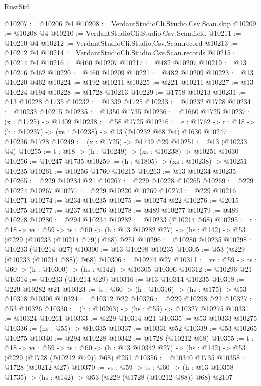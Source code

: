\begin{lexlean}{RustStd}
\begin{coremodule}
@10207 := @10206 @4
@10208 := VerdantStudioCli.Studio.Csv.Scan.skip
@10209 := @10208 @4
@10210 := VerdantStudioCli.Studio.Csv.Scan.field
@10211 := @10210 @4
@10212 := VerdantStudioCli.Studio.Csv.Scan.record
@10213 := @10212 @4
@10214 := VerdantStudioCli.Studio.Csv.Scan.records
@10215 := @10214 @4
@10216 := @460 @10207
@10217 := @482 @10207
@10219 := @13 @10216 @462
@10220 := @460 @10209
@10221 := @482 @10209
@10223 := @13 @10220 @462
@10224 := @192 @10211
@10225 := @221 @10211
@10227 := @13 @10224 @194
@10228 := @1728 @10213
@10229 := @1758 @10213
@10231 := @13 @10228 @1735
@10232 := @1339 @1725
@10233 := @10232 @1728
@10234 := @10233 @10215
@10235 := @1350 @1735
@10236 := @1660 @1725
@10237 := (x : @1725) -> @1409
@10238 := @58 @1725
@10246 := {e : @1762} -> {t : @18} -> (h : @10237) -> (xs : @10238) -> @13 (@10232 @68 @4) @1630
@10247 := @10236 @1728
@10249 := (x : @1725) -> @1749 @29
@10251 := @13 (@10233 @4)
@10255 := {t : @18} -> (h : @10249) -> (xs : @10238) -> @10251 @1630
@10256 := @10247 @1735
@10259 := (h : @1805) -> (xs : @10238) -> @10251 @10235
@10261 := @10256 @1760 @10215
@10263 := @13 @10234 @10235
@10265 := @229 @10234 @21
@10267 := @229 @10228 @10265
@10269 := @229 @10224 @10267
@10271 := @229 @10220 @10269
@10273 := @229 @10216 @10271
@10274 := @234 @10235
@10275 := @10274 @22
@10276 := @2015 @10275
@10277 := @237 @10276
@10278 := @489 @10277
@10279 := @489 @10278
@10280 := @294 @10234
@10282 := @10233 (@10214 @68)
@10295 := {t : @18} ->
  {vs : @59} ->
  {ts : @60} -> (h : @13 @10282 @27) -> (hs : @142) -> @53 (@229 (@10233 (@10214 @79)) @68) @251
@10296 := @10280 @10235
@10298 := @10233 (@10214 @27)
@10300 := @13 @10298 @10235
@10305 := @53 (@229 (@10233 (@10214 @88)) @68)
@10306 := @10274 @27
@10311 := {vs : @59} -> {ts : @60} -> (h : @10300) -> (hs : @142) -> @10305 @10306
@10312 := @10296 @21
@10314 := @10233 (@10214 @29)
@10316 := @13 @10314 @10235
@10318 := @229 @10282 @21
@10323 := {ts : @60} -> (h : @10316) -> (hs : @175) -> @53 @10318 @10306
@10324 := @10312 @22
@10326 := @229 @10298 @21
@10327 := @53 @10326
@10330 := (h : @10263) -> (hs : @55) -> @10327 @10275
@10331 := @10324 @10261
@10333 := @229 @10314 @21
@10335 := @53 @10333 @10275
@10336 := (hs : @55) -> @10335
@10337 := @10331 @52
@10339 := @53 @10265 @10275
@10340 := @294 @10228
@10342 := @1728 (@10212 @68)
@10355 := {t : @18} ->
  {vs : @59} ->
  {ts : @60} -> (h : @13 @10342 @27) -> (hs : @142) -> @53 (@229 (@1728 (@10212 @79)) @68) @251
@10356 := @10340 @1735
@10358 := @1728 (@10212 @27)
@10370 := {vs : @59} ->
  {ts : @60} -> (h : @13 @10358 @1735) -> (hs : @142) -> @53 (@229 (@1728 (@10212 @88)) @68) @2107

\end{coremodule}
\end{lexlean}
